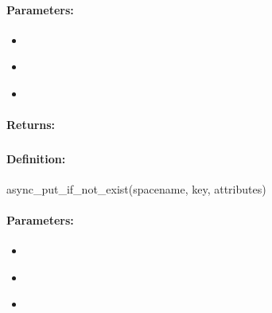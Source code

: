 \paragraph{Parameters:}
\begin{itemize}[noitemsep]
\item {}\\

\item {}\\

\item {}\\

\end{itemize}

\paragraph{Returns:}


\pagebreak
\subsubsection{}
\label{api:ruby:async_put_if_not_exist}


\paragraph{Definition:}
\begin{rubycode}
async_put_if_not_exist(spacename, key, attributes)
\end{rubycode}

\paragraph{Parameters:}
\begin{itemize}[noitemsep]
\item {}\\

\item {}\\

\item {}\\

\end{itemize}

